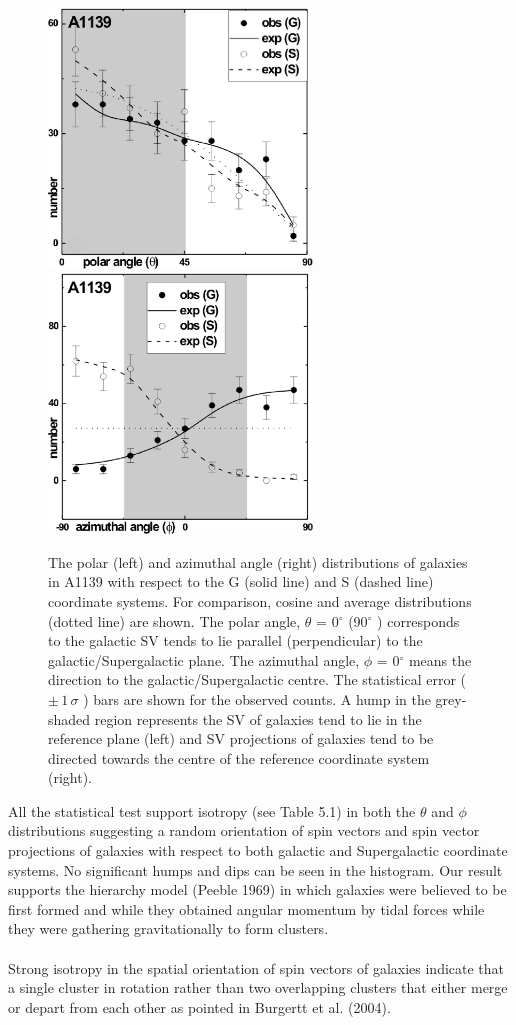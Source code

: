 \begin{figure}[h]
\centering \vspace{0.0cm}
     \centering \vspace{0.0cm}
     \includegraphics[height=6.9cm]{A1139_theta.eps}
      \includegraphics[height=6.9cm]{A1139_phi.eps}
            \caption[]{ The polar (left) and azimuthal angle (right) distributions of galaxies in A1139
with respect to the G (solid line) and S (dashed line) coordinate systems.
For comparison, cosine and average distributions (dotted line) are shown.
The polar angle, $\theta$ = 0$^\circ$ (90$^\circ$ ) corresponds to the galactic SV tends to lie
parallel (perpendicular) to the galactic/Supergalactic plane. The azimuthal
angle, $\phi$ = 0$^\circ$ means the direction to the galactic/Supergalactic centre. The
statistical error ($\pm\, 1\, \sigma$ ) bars are shown for the observed counts. A hump in the
grey-shaded region represents the SV of galaxies tend to lie in the reference
plane (left) and SV projections of galaxies tend to be directed towards the
centre of the reference coordinate system (right).
}
\end{figure}
\noindent All the statistical test support isotropy (see Table 5.1)
in both the $\theta$ and $\phi$ distributions suggesting a random orientation of spin vectors and spin vector projections of galaxies with respect to both galactic and Supergalactic coordinate systems. No significant humps and dips can be seen in the histogram. Our result supports the hierarchy model (Peeble 1969) in which galaxies were believed to be first formed and while they obtained angular momentum by tidal forces while they were gathering gravitationally to form clusters.\\\\
Strong isotropy in the spatial orientation of spin vectors of galaxies indicate that a single cluster in rotation rather than two overlapping clusters that either merge or depart from each other as pointed in Burgertt et al. (2004).
